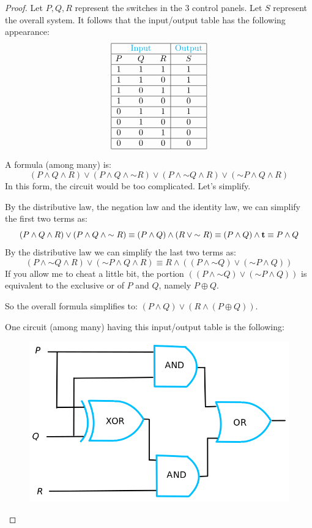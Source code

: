 \documentclass[14pt]{extarticle}
\newcommand{\true}{{\bf t}}
\begin{document}
\begin{proof} 
Let $P, Q, R$ represent the switches in the 3 control panels. Let $S$ represent the overall system. It follows that the input/output table has the following appearance:
$$ 
\begin{array}{|ccc|c|} 
\hline 
& \color{cyan}\text{Input} & & \color{cyan}\text{Output} \\ 
\hline 
P&Q&R&S\\ 
\hline 
1&1&1&1\\ 
\hline 
1&1&0&1\\
\hline 
1&0&1&1\\ 
\hline 
1&0&0&0\\ 
\hline 
0&1&1&1\\ 
\hline 
0&1&0&0\\ 
\hline
0&0&1&0\\ 
\hline 
0&0&0&0\\ 
\hline 
\end{array} 
$$

A formula (among many) is: 
$$ 
(P \wedge Q \wedge R) \vee (P \wedge Q \wedge {\sim R}) \vee (P \wedge {\sim Q} \wedge R) \vee ({\sim P} \wedge Q \wedge R) 
$$
In this form, the circuit would be too complicated. Let's simplify.

By the distributive law, the negation law and the identity law, we can simplify the first two terms as: 
$$ 
(P \wedge Q \wedge R) \vee (P \wedge Q \wedge {\sim R}) \equiv (P \wedge Q) \wedge (R \vee {\sim R}) \equiv (P \wedge Q) \wedge
\true \equiv P \wedge Q
$$ 
By the distributive law we can simplify the last two
terms as: 
$$ 
(P \wedge {\sim Q} \wedge R) \vee ({\sim P} \wedge Q \wedge R)
\equiv R \wedge ((P \wedge {\sim Q}) \vee ({\sim P} \wedge Q)) 
$$ 
If you allow me to cheat a little bit, the portion $((P \wedge {\sim Q}) \vee ({\sim P} \wedge Q))$ is equivalent to the exclusive or of $P$ and $Q$, namely $P \oplus Q$.

So the overall formula simplifies to: $(P \wedge Q) \vee (R \wedge (P \oplus Q))$.

One circuit (among many) having this input/output table is the following:

\begin{figure}[ht!] 
\centering 
\includegraphics[scale=0.3]{../images/2.4.25.png}
\end{figure} 
\end{proof}
\end{document}
